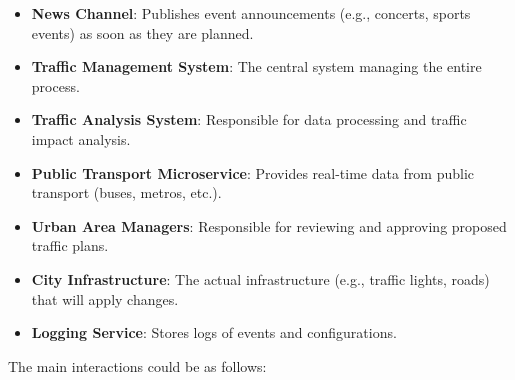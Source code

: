 \documentclass[11.5pt]{article}
\begin{document}
    \begin{itemize}
        \item \textbf{News Channel}: Publishes event announcements (e.g., concerts, sports events) as soon as they are planned.
        \item \textbf{Traffic Management System}: The central system managing the entire process.
        \item \textbf{Traffic Analysis System}: Responsible for data processing and traffic impact analysis.
        \item \textbf{Public Transport Microservice}: Provides real-time data from public transport (buses, metros, etc.).
        \item \textbf{Urban Area Managers}: Responsible for reviewing and approving proposed traffic plans.
        \item \textbf{City Infrastructure}: The actual infrastructure (e.g., traffic lights, roads) that will apply changes.
        \item \textbf{Logging Service}: Stores logs of events and configurations.
    \end{itemize}
    The main interactions could be as follows:
\end{document}
